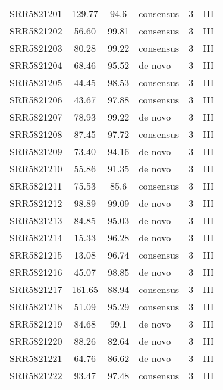 \begin{scriptsize}
\begin{center}
\begin{longtable}{@{}lcclcc@{}}
SRR5821201 & 129.77        & 94.6        & consensus    & 3        & III      \\
SRR5821202 & 56.60         & 99.81       & consensus    & 3        & III      \\
SRR5821203 & 80.28         & 99.22       & consensus    & 3        & III      \\
SRR5821204 & 68.46         & 95.52       & de novo      & 3        & III      \\
SRR5821205 & 44.45         & 98.53       & consensus    & 3        & III      \\
SRR5821206 & 43.67         & 97.88       & consensus    & 3        & III      \\
SRR5821207 & 78.93         & 99.22       & de novo      & 3        & III      \\
SRR5821208 & 87.45         & 97.72       & consensus    & 3        & III      \\
SRR5821209 & 73.40         & 94.16       & de novo      & 3        & III      \\
SRR5821210 & 55.86         & 91.35       & de novo      & 3        & III      \\
SRR5821211 & 75.53         & 85.6        & consensus    & 3        & III      \\
SRR5821212 & 98.89         & 99.09       & de novo      & 3        & III      \\
SRR5821213 & 84.85         & 95.03       & de novo      & 3        & III      \\
SRR5821214 & 15.33         & 96.28       & de novo      & 3        & III      \\
SRR5821215 & 13.08         & 96.74       & consensus    & 3        & III      \\
SRR5821216 & 45.07         & 98.85       & de novo      & 3        & III      \\
SRR5821217 & 161.65        & 88.94       & consensus    & 3        & III      \\
SRR5821218 & 51.09         & 95.29       & consensus    & 3        & III      \\
SRR5821219 & 84.68         & 99.1        & de novo      & 3        & III      \\
SRR5821220 & 88.26         & 82.64       & de novo      & 3        & III      \\
SRR5821221 & 64.76         & 86.62       & de novo      & 3        & III      \\
SRR5821222 & 93.47         & 97.48       & consensus    & 3        & III      \\

\end{longtable}
\end{center}
\end{scriptsize}

